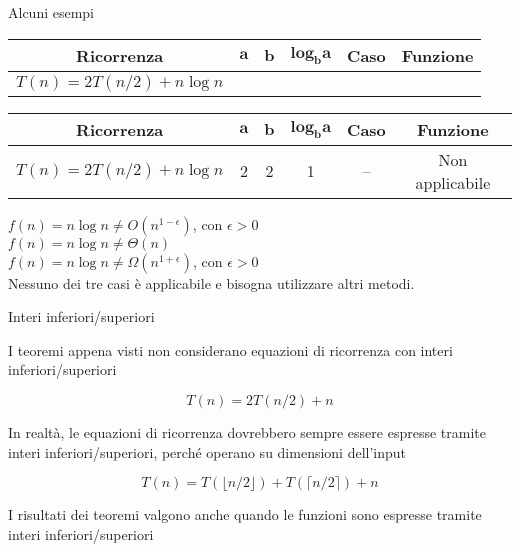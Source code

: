 \begin{frame}[shrink=6]{Alcuni esempi}

\bgroup
\def\arraystretch{1.1}

\begin{overprint}


\begin{tabular}{|c|c|c|c|c|c|}
\hline
\textbf{Ricorrenza} & $\mathbf{a}$ & $\mathbf{b}$ & $\mathbf{\textbf{log}_b a}$ & \textbf{Caso} & \textbf{Funzione} \\
\hline
$T(n) = 2T(n/2)+n \log n$ &  &  &  &  &  \\
\hline
\end{tabular}


\begin{tabular}{|c|c|c|c|c|c|}
\hline
\textbf{Ricorrenza} & $\mathbf{a}$ & $\mathbf{b}$ & $\mathbf{\textbf{log}_b a}$ & \textbf{Caso} & \textbf{Funzione} \\
\hline
$T(n) = 2T(n/2)+n \log n$ & 2 & 2 & 1 & -- & Non applicabile \\
\hline
\end{tabular}

\end{overprint}

\egroup

\begin{mybox}
$f(n) = n \log n \neq O(n^{1-\epsilon})$, con $\epsilon>0$\\[3pt]
$f(n) = n \log n \neq \Theta(n)$\\[3pt]
$f(n) = n \log n \neq \Omega(n^{1+\epsilon})$, con $\epsilon>0$\\[3pt]
   
Nessuno dei tre casi è applicabile e bisogna utilizzare altri metodi.
\end{mybox}

\end{frame}

\begin{frame}{Interi inferiori/superiori}

\BIL
\item I teoremi appena visti non considerano equazioni di ricorrenza con interi inferiori/superiori

\[
T(n) = 2T(n/2) + n
\]

\item In realtà, le equazioni di ricorrenza dovrebbero sempre essere espresse tramite interi inferiori/superiori, perché operano su dimensioni dell'input

\[
T(n) = T(\lfloor n/2 \rfloor) + T(\lceil n/2 \rceil) + n
\]

\item I risultati dei teoremi valgono anche quando le funzioni sono espresse tramite interi inferiori/superiori

\EIL
	
\end{frame}


